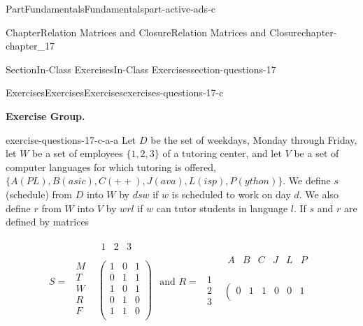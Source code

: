 \documentclass[oneside,10pt,]{book}
\numberwithin{equation}{section}
\begin{document}
\begin{partptx}{Part}{Fundamentals}{}{Fundamentals}{}{}{part-active-ads-c}
\begin{chapterptx}{Chapter}{Relation Matrices and Closure}{}{Relation Matrices and Closure}{}{}{chapter-chapter_17}
\begin{sectionptx}{Section}{In-Class Exercises}{}{In-Class Exercises}{}{}{section-questions-17}
\begin{exercises-subsection-numberless}{Exercises}{Exercises}{}{Exercises}{}{}{exercises-questions-17-c}
\par\medskip\noindent%
\textbf{Exercise Group.}\space\space%
\begin{exercisegroup}
\begin{divisionexerciseeg}{1}{}{}{exercise-questions-17-c-a-a}%
Let \(D\) be the set of weekdays, Monday through Friday, let \(W\) be a set of employees \(\{1, 2, 3\}\) of a tutoring center, and let \(V\) be a set of computer languages for which tutoring is offered,  \(\{A(PL), B(asic), C(++), J(ava), L(isp), P(ython)\}\). We define \(s\) (schedule) from \(D\) into \(W\) by \(d s w\) if \(w\) is scheduled to work on day \(d\). We also define \(r\) from \(W\) into \(V\) by \(w r l\) if \(w\) can tutor students in language \(l\). If \(s\) and \(r\) are defined by matrices%
\par
%
\begin{equation*}
S = 
\begin{array}{cc}
& 
\begin{array}{ccc}
1 & 2 & 3 \\
\end{array}
\\
\begin{array}{c}
M \\
T \\
W \\
R \\
F \\
\end{array}
& 
\left(
\begin{array}{ccc}
1 & 0 & 1 \\
0 & 1 & 1 \\
1 & 0 & 1 \\
0 & 1 & 0 \\
1 & 1 & 0 \\
\end{array}
\right) \\
\end{array}
\textrm{ and }R=
\begin{array}{cc}
& 
\begin{array}{cccccc}
A & B & C & J & L & P \\
\end{array}
\\
\begin{array}{c}
1 \\
2 \\
3 \\
\end{array}
& \left(
\begin{array}{cccccc}
0 & 1 & 1 & 0 & 0 & 1 \\

\end{array}
\end{array}
\end{equation*}
\end{divisionexerciseeg}
\end{exercisegroup}
\end{exercises-subsection-numberless}
\end{sectionptx}
\end{chapterptx}
\end{partptx}
\end{document}
